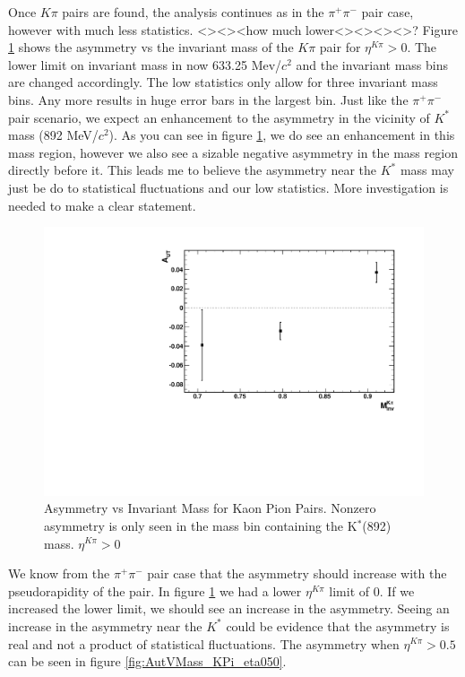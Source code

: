 \documentclass[abstract = on,listof=totoc, bibliography=totoc]{scrreprt}
\newcommand{\pip}{\pi^+}
\newcommand{\pim}{\pi^-}
\newcommand{\pair}{$\pip\pim$ }
\newcommand{\etakp}{\eta^{K\pi}}
\begin{document}
Once $K\pi$ pairs are found, the analysis continues as in the \pair pair case, however with much less statistics. <><><how much lower<><><><>? Figure \ref{fig:AutVMass_KPi} shows the asymmetry vs the invariant mass of the $K\pi$ pair for $\etakp > 0$. The lower limit on invariant mass in now 633.25 Mev/$c^2$ and the invariant mass bins are changed accordingly. The low statistics only allow for three invariant mass bins. Any more results in huge error bars in the largest bin. Just like the \pair pair scenario, we expect an enhancement to the asymmetry in the vicinity of $K^*$ mass (892 MeV/$c^2$). As you can see in figure \ref{fig:AutVMass_KPi}, we do see an enhancement in this mass region, however we also see a sizable negative asymmetry in the mass region directly before it. This leads me to believe the asymmetry near the $K^*$ mass may just be do to statistical fluctuations and our low statistics. More investigation is needed to make a clear statement. 

\begin{figure}
\begin{center}
\includegraphics[width = .6\textwidth]{AutVMass_KPi}
\caption[Asymmetry vs Invariant Mass for Kaon Pion Pairs]{Asymmetry vs Invariant Mass for Kaon Pion Pairs. Nonzero asymmetry is only seen in the mass bin containing the K$^*$(892) mass. $\etakp > 0$}
\label{fig:AutVMass_KPi}
\end{center}
\end{figure}


We know from the \pair pair case that the asymmetry should increase with the pseudorapidity of the pair. In figure \ref{fig:AutVMass_KPi} we had a lower $\etakp$ limit of 0. If we increased the lower limit, we should see an increase in the asymmetry. Seeing an increase in the asymmetry near the $K^*$ could be evidence that the asymmetry is real and not a product of statistical fluctuations. The asymmetry when $\etakp > 0.5$ can be seen in figure \ref{fig:AutVMass_KPi_eta050}. 
\end{document}
